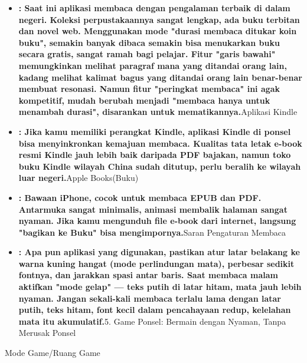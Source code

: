 \begin{itemize}
  \item \textbf{: Saat ini aplikasi membaca dengan pengalaman terbaik di dalam negeri. Koleksi perpustakaannya sangat lengkap, ada buku terbitan dan novel web. Menggunakan mode "durasi membaca ditukar koin buku", semakin banyak dibaca semakin bisa menukarkan buku secara gratis, sangat ramah bagi pelajar. Fitur "garis bawahi" memungkinkan melihat paragraf mana yang ditandai orang lain, kadang melihat kalimat bagus yang ditandai orang lain benar-benar membuat resonasi. Namun fitur "peringkat membaca" ini agak kompetitif, mudah berubah menjadi "membaca hanya untuk menambah durasi", disarankan untuk mematikannya.}Aplikasi Kindle
  \item \textbf{: Jika kamu memiliki perangkat Kindle, aplikasi Kindle di ponsel bisa menyinkronkan kemajuan membaca. Kualitas tata letak e-book resmi Kindle jauh lebih baik daripada PDF bajakan, namun toko buku Kindle wilayah China sudah ditutup, perlu beralih ke wilayah luar negeri.}Apple Books(Buku)
  \item \textbf{: Bawaan iPhone, cocok untuk membaca EPUB dan PDF. Antarmuka sangat minimalis, animasi membalik halaman sangat nyaman. Jika kamu mengunduh file e-book dari internet, langsung "bagikan ke Buku" bisa mengimpornya.}Saran Pengaturan Membaca
  \item \textbf{: Apa pun aplikasi yang digunakan, pastikan atur latar belakang ke warna kuning hangat (mode perlindungan mata), perbesar sedikit fontnya, dan jarakkan spasi antar baris. Saat membaca malam aktifkan "mode gelap" — teks putih di latar hitam, mata jauh lebih nyaman. Jangan sekali-kali membaca terlalu lama dengan latar putih, teks hitam, font kecil dalam pencahayaan redup, kelelahan mata itu akumulatif.}5. Game Ponsel: Bermain dengan Nyaman, Tanpa Merusak Ponsel
\end{itemize}


Mode Game/Ruang Game

